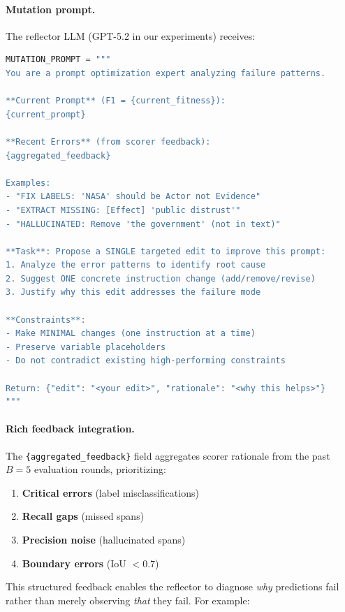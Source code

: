 \documentclass[11pt]{article}
\begin{document}
\paragraph{Mutation prompt.} The reflector LLM (GPT-5.2 in our experiments) receives:

\begin{lstlisting}[language=Python, caption=Mutation Prompt Template (Pseudocode)]
MUTATION_PROMPT = """
You are a prompt optimization expert analyzing failure patterns.

**Current Prompt** (F1 = {current_fitness}):
{current_prompt}

**Recent Errors** (from scorer feedback):
{aggregated_feedback}

Examples:
- "FIX LABELS: 'NASA' should be Actor not Evidence"
- "EXTRACT MISSING: [Effect] 'public distrust'"
- "HALLUCINATED: Remove 'the government' (not in text)"

**Task**: Propose a SINGLE targeted edit to improve this prompt:
1. Analyze the error patterns to identify root cause
2. Suggest ONE concrete instruction change (add/remove/revise)
3. Justify why this edit addresses the failure mode

**Constraints**:
- Make MINIMAL changes (one instruction at a time)
- Preserve variable placeholders
- Do not contradict existing high-performing constraints

Return: {"edit": "<your edit>", "rationale": "<why this helps>"}
"""
\end{lstlisting}

\paragraph{Rich feedback integration.} The \texttt{\{aggregated\_feedback\}} field aggregates scorer rationale from
the past $B = 5$ evaluation rounds, prioritizing:
\begin{enumerate}[noitemsep]
	\item \textbf{Critical errors} (label misclassifications)
	\item \textbf{Recall gaps} (missed spans)
	\item \textbf{Precision noise} (hallucinated spans)
	\item \textbf{Boundary errors} (IoU $< 0.7$)
\end{enumerate}

This structured feedback enables the reflector to diagnose \textit{why}
predictions fail rather than merely observing \textit{that} they fail. For
example:
\end{document}

